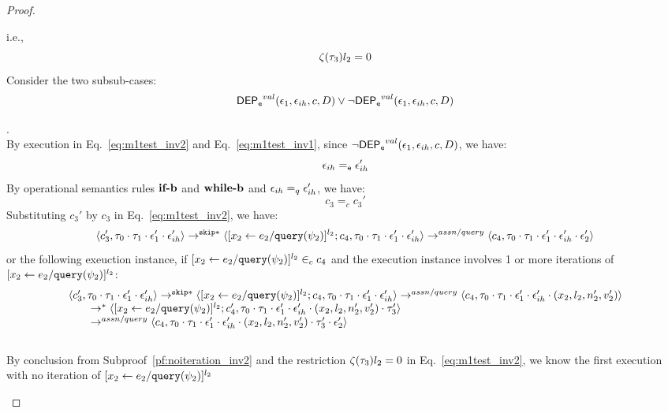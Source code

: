 \begin{proof}
\begin{case}[$\trace_2 = \trace_{ih} \cdot \event_{ih}$]
\begin{subcase}
\[ \]
i.e., 
\[
  \mathtt{\zeta}(\mathtt{\tau}_3) l_2 = 0
\]
Consider the two subsub-cases: 
%
$$
\mathsf{DEP_{\mathtt{e}}}^{val}(\mathtt{\epsilon}_1, \mathtt{\epsilon}_{ih}, c, D) \lor \neg\mathsf{DEP_{\mathtt{e}}}^{val}(\mathtt{\epsilon}_1, \mathtt{\epsilon}_{ih}, c, D)
$$
%
\begin{subsubcase}
.
\label{case:valdep_ihtestnodep}
\\
By execution in Eq.~\ref{eq:m1test_inv2} and Eq.~\ref{eq:m1test_inv1}, 
since $\neg\mathsf{DEP_{\mathtt{e}}}^{val}(\mathtt{\epsilon}_1, \mathtt{\epsilon}_{ih}, c, D)$, we have:
\[
  \mathtt{\epsilon}_{ih} =_{\mathtt{e}} \mathtt{\epsilon}_{ih}'
\]
By operational semantics rules $\rname{if-b}$ and $\rname{while-b}$ and $\mathtt{\epsilon}_{ih} =_q \mathtt{\epsilon}_{ih}'$, we have:
\[
 c_3 =_c c_3'
\]
%
Substituting $c_3'$ by $c_3$ in Eq.~\ref{eq:m1test_inv2}, we have:
\[
  \langle c_3', \mathtt{\tau}_0 \cdot \mathtt{\tau}_1 \cdot \mathtt{\epsilon}_1' \cdot \mathtt{\epsilon}_{ih}' \rangle 
  \rightarrow^{\mathtt{skip}*} 
  \langle [\mathrel{ {x}_2 \leftarrow e_2 / {\tt query}(\psi_2) }]^{l_2};{c}_4, 
  \mathtt{\tau}_0 \cdot \mathtt{\tau}_1 \cdot \mathtt{\epsilon}_1' \cdot \mathtt{\epsilon}_{ih}' \rangle
  \rightarrow^{assn/query} 
  \langle {c}_4,  \mathtt{\tau}_0 \cdot \mathtt{\tau}_1 \cdot \mathtt{\epsilon}_1' \cdot \mathtt{\epsilon}_{ih}' \cdot \mathtt{\epsilon}_2' \rangle 
\]
%
or the following exeuction instance, 
if $[\mathrel{ {x}_2 \leftarrow e_2 / {\tt query}(\psi_2) }]^{l_2} \in_c c_4$ and 
the execution instance involves 1 or more iterations of $[\mathrel{ {x}_2 \leftarrow e_2 / {\tt query}(\psi_2) }]^{l_2}$:
%
\[
 \begin{array}{l}
  \langle c_3', \mathtt{\tau}_0 \cdot \mathtt{\tau}_1 \cdot \mathtt{\epsilon}_1' \cdot \mathtt{\epsilon}_{ih}' \rangle 
  \rightarrow^{\mathtt{skip}*} 
  \langle [\mathrel{ {x}_2 \leftarrow e_2 / {\tt query}(\psi_2) }]^{l_2};{c}_4, 
  \mathtt{\tau}_0 \cdot \mathtt{\tau}_1 \cdot \mathtt{\epsilon}_1' \cdot \mathtt{\epsilon}_{ih}' \rangle
  \rightarrow^{assn/query} 
  \langle {c}_4,  \mathtt{\tau}_0 \cdot \mathtt{\tau}_1 \cdot \mathtt{\epsilon}_1' \cdot \mathtt{\epsilon}_{ih}' \cdot (x_2, l_2, n_2', v_2') \rangle 
  \\ \qquad 
  \rightarrow^{*} 
  \langle [\mathrel{ {x}_2 \leftarrow e_2 / {\tt query}(\psi_2) }]^{l_2};{c}_4', 
  \mathtt{\tau}_0 \cdot \mathtt{\tau}_1 \cdot \mathtt{\epsilon}_1' \cdot \mathtt{\epsilon}_{ih}'\cdot (x_2, l_2, n_2', v_2') \cdot \mathtt{\tau}_3' \rangle
  \\ \qquad 
  \rightarrow^{assn/query} 
  \langle {c}_4,  \mathtt{\tau}_0 \cdot \mathtt{\tau}_1 \cdot \mathtt{\epsilon}_1' \cdot \mathtt{\epsilon}_{ih}' \cdot (x_2, l_2, n_2', v_2')\cdot \mathtt{\tau}_3' \cdot \mathtt{\epsilon}_2' \rangle 
 \end{array} 
\]
%
\\
By conclusion from Subproof~\ref{pf:noiteration_inv2} and the restriction $\mathtt{\zeta}(\mathtt{\tau}_3) l_2 = 0$ in Eq.~\ref{eq:m1test_inv2}, 
we know
the first execution with no iteration of $[\mathrel{ {x}_2 \leftarrow e_2 / {\tt query}(\psi_2) }]^{l_2}$ 

\end{subsubcase}
\end{subcase}
\end{case}
\end{proof}
